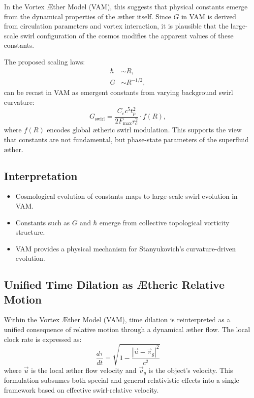 \documentclass[preprint]{revtex4-2}
\begin{document}
            In the Vortex \AE ther Model (VAM), this suggests that physical constants emerge from the dynamical properties of the æther itself. Since $G$ in VAM is derived from circulation parameters and vortex interaction, it is plausible that the large-scale swirl configuration of the cosmos modifies the apparent values of these constants.

            The proposed scaling laws:
            \begin{align*}
            \hbar &\sim R, \\
            G &\sim R^{-1/2},
            \end{align*}
            can be recast in VAM as emergent constants from varying background swirl curvature:
            \begin{equation}
            G_\text{swirl} = \frac{C_e c^5 t_p^2}{2 F_\text{max} r_c^2} \cdot f(R),
            \end{equation}
            where $f(R)$ encodes global ætheric swirl modulation. This supports the view that constants are not fundamental, but phase-state parameters of the superfluid æther.

            \subsection*{Interpretation}
            \begin{itemize}
            \item Cosmological evolution of constants maps to large-scale swirl evolution in VAM.
            \item Constants such as $G$ and $\hbar$ emerge from collective topological vorticity structure.
            \item VAM provides a physical mechanism for Stanyukovich’s curvature-driven evolution.
            \end{itemize}

            \subsection*{Unified Time Dilation as Ætheric Relative Motion}
            Within the Vortex Æther Model (VAM), time dilation is reinterpreted as a unified consequence of relative motion through a dynamical æther flow. The local clock rate is expressed as:
            \[
                \frac{d\tau}{dt} = \sqrt{1 - \frac{|\vec{u} - \vec{v}_g|^2}{c^2}}
            \]
            where $\vec{u}$ is the local æther flow velocity and $\vec{v}_g$ is the object's velocity. This formulation subsumes both special and general relativistic effects into a single framework based on effective swirl-relative velocity.
\end{document}
